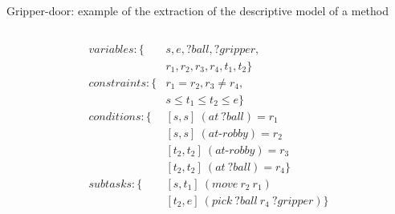 \begin{frame}[c,fragile]{Gripper-door: example of the extraction of the descriptive model of a method}
\begin{columns}[c, T]
\begin{column}{0.32\textwidth}
\tiny
\begin{align*}
    variables: \{&s,e,?ball,?gripper,\\
    &r_1,r_2,r_3,r_4,t_1,t_2\} \\
    constraints : \{ &r_1 = r_2, r_3 \neq r_4, \\
        & s \leq t_1 \leq t_2 \leq e \}\\
    conditions : \{&[s,s]~(at\ ?ball) = r_1 \\
        &[s,s]~(at\text{-}robby) = r_2 \\
        &[t_2,t_2]~(at\text{-}robby) = r_3 \\
        &[t_2,t_2]~(at\ ?ball) = r_4 \} \\
    subtasks : \{ &[s,t_1]~(move\ r_2\ r_1) \\
        &[t_2,e]~(pick\ ?ball\ r_4\ ?gripper)\}
\end{align*}  
        \end{column}
    \end{columns}
\end{frame}



